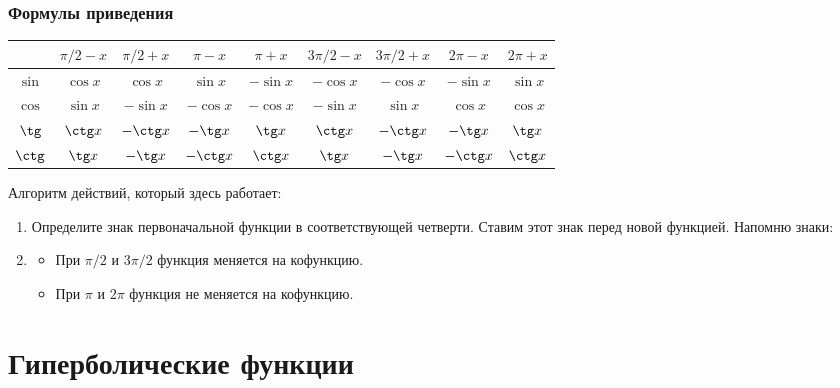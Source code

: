 \subsubsection{Формулы приведения}
\tiny
\begin{longtable}{|c|c|c|c|c|c|c|c|c|}
\hline
&
$\pi/2-x$
&
$\pi/2+x$
&
$\pi-x$
&
$\pi+x$
&
$3\pi/2-x$
&
$3\pi/2+x$
&
$2\pi-x$
&
$2\pi+x$
\\\hline
$\sin$
&
$\cos x$
&
$\cos x$
&
$\sin x$
&
$-\sin x$
&
$-\cos x$
&
$-\cos x$
&
$-\sin x$
&
$\sin x$
\\\hline
$\cos$
&
$\sin x$
&
$-\sin x$
&
$-\cos x$
&
$-\cos x$
&
$-\sin x$
&
$\sin x$
&
$\cos x$
&
$\cos x$
\\\hline
$\tg$
&
$\ctg x$
&
$-\ctg x$
&
$-\tg x$
&
$\tg x$
&
$\ctg x$
&
$-\ctg x$
&
$-\tg x$
&
$\tg x$
\\\hline
$\ctg$
&
$\tg x$
&
$-\tg x$
&
$-\ctg x$
&
$\ctg x$
&
$\tg x$
&
$-\tg x$
&
$-\ctg x$
&
$\ctg x$
\\\hline
\end{longtable}
\normalsize
Алгоритм действий, который здесь работает:
\begin{enumerate}
\item
Определите знак первоначальной функции в соответствующей четверти. Ставим этот знак перед новой функцией. Напомню знаки:
\item
\begin{itemize}
\item 
При $\pi/2$ и $3\pi/2$ функция меняется на кофункцию. %
\item
При $\pi$ и $2\pi$ функция не меняется на кофункцию. %
\end{itemize}
\end{enumerate}

\iffalse
\begin{exmpl}
$\cos(270^{\circ}-x)=?$. Данный угол лежит в третьей четверти, косинус в третьей четверти отрицателен. Меняем функцию на кофункцию, так как у нас 270 градусов, значит: $\cos(270^{\circ}-x)=-\sin x$. Верно!
\end{exmpl}
\fi

\section{Гиперболические функции}

